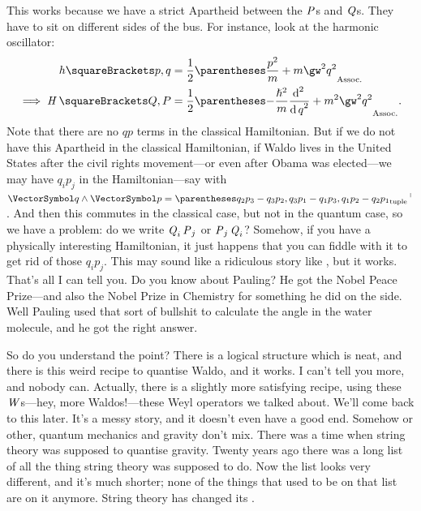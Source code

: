 \documentclass[10pt, a4paper, twoside]{lecturenotes}
\begin{document}
\begin{lecture}[date=2013-04-16]
This works because we have a strict Apartheid between the $\operatorname{\mathit{P}}$s and $\operatorname{\mathit{Q}}$s. They have to sit on different sides of the bus.
For instance, look at the harmonic oscillator:
\begin{align*}
h\of{p,q}&= \frac{1}{2}\pa{\frac{p^2}{m}+m\gw^2 q^2}\\
\Implies
\opH\of{Q, P} &= \frac{1}{2}\pa{-\frac{\ReducedPlanck^2}{m}\derivop[2] q + m^2 \gw^2 q^2}\text.
\end{align*}
Note that there are no $qp$ terms in the classical Hamiltonian.
But if we do not have this Apartheid in the classical Hamiltonian, if Waldo lives in the United States after the civil rights movement---or even after Obama was elected---we may have $q_i p_j$ in the Hamiltonian---say with $\vq \Exterior \vp = \smash{\Transpose{\tuple{q_2 p_3 - q_3 p_2, q_3 p_1 - q_1 p_3, q_1 p_2 - q_2 p_1}}}$. And then this commutes in the classical case, but not in the quantum case, so we have a problem: do we write $\operatorname{\mathit{Q}}_i \operatorname{\mathit{P}}_j$ or $\operatorname{\mathit{P}}_j \operatorname{\mathit{Q}}_i$? Somehow, if you have a physically interesting Hamiltonian, it just happens that you can fiddle with it to get rid of those $q_i p_j$. This may sound like a ridiculous story like , but it works. That's all I can tell you. Do you know about Pauling? He got the Nobel Peace Prize---and also the Nobel Prize in Chemistry for something he did on the side. Well Pauling used that sort of bullshit to calculate the angle in the water molecule, and he got the right answer.

So do you understand the point? There is a logical structure which is neat, and there is this weird recipe to quantise Waldo, and it works. I can't tell you more, and nobody can. Actually, there is a slightly more satisfying recipe, using these $\operatorname{\mathit{W}}$s---hey, more Waldos!---these Weyl operators we talked about. We'll come back to this later. It's a messy story, and it doesn't even have a good end. Somehow or other, quantum mechanics and gravity don't mix. There was a time when string theory was supposed to quantise gravity. Twenty years ago there was a long list of all the thing string theory was supposed to do. Now the list looks very different, and it's much shorter; none of the things that used to be on that list are on it anymore. String theory has changed its .
\end{lecture}
\end{document}
